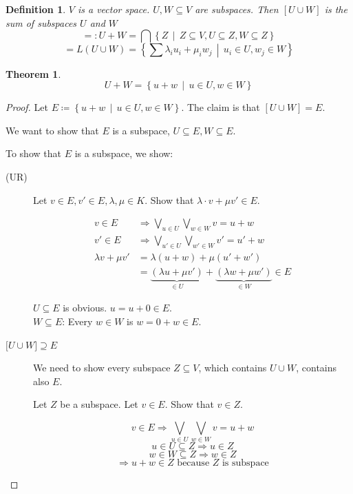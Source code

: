 \documentclass[a4paper,landscape,twocolumn]{article}
\newcommand\setdef[2]{\left\{#1\,\middle|\,#2\right\}}
\newtheorem{theorem}{Theorem}
\newtheorem{defi}{Definition}
\begin{document}
\begin{defi}
  $V$ is a vector space. $U, W \subseteq V$ are subspaces.
  Then $[U \cup W]$ is the \emph{sum of subspaces $U$ and $W$}
  \[
      =: U+W
      = \bigcap \setdef{Z}{Z \subseteq V, U \subseteq Z, W \subseteq Z}
  \] \[
      = L(U \cup W)
      = \setdef{\sum \lambda_i u_i + \mu_i w_j}{u_i \in U, w_j \in W}
  \]
\end{defi}

\begin{theorem}
  \label{satz-4-2}
  \[ U + W = \setdef{u+w}{u \in U, w \in W} \]
\end{theorem}

\begin{proof}
  Let $E \coloneqq \setdef{u+w}{u \in U, w \in W}$.
  The claim is that $\left[U \cup W\right] = E$.

  We want to show that $E$ is a subspace, $U \subseteq E, W \subseteq E$.

  To show that $E$ is a subspace, we show:
  \begin{description}
    \item[(UR)] Let $v \in E, v' \in E, \lambda, \mu \in K$.
      Show that $\lambda \cdot v + \mu v' \in E$.

      \begin{align*}
         v \in E &\Rightarrow \bigvee_{u \in U} \bigvee_{w \in W} v = u + w \\
         v' \in E &\Rightarrow \bigvee_{u' \in U} \bigvee_{w' \in W} v' = u' + w \\
         \lambda v + \mu v' &= \lambda(u + w) + \mu(u' + w') \\
         &= \underbrace{(\lambda u + \mu v')}_{\in U} + \underbrace{(\lambda w + \mu w')}_{\in W} \in E
      \end{align*}

      $U \subseteq E$ is obvious. $u = u + 0 \in E$. \\
      $W \subseteq E$: Every $w \in W$ is $w = 0 + w \in E$.

    \item[${[}U \cup W{]} \supseteq E$]
      We need to show every subspace $Z \subseteq V$, which contains $U \cup W$, contains also $E$.

      Let $Z$ be a subspace. Let $v \in E$. Show that $v \in Z$.

      \[ v \in E \Rightarrow \bigvee_{u \in U} \bigvee_{w \in W} v = u + w \]
      \[ u \in U \subseteq Z \Rightarrow u \in Z \]
      \[ w \in W \subseteq Z \Rightarrow w \in Z \]
      \[ \Rightarrow u + w \in Z \text{ because } Z \text{ is subspace} \]
  \end{description}
\end{proof}
\end{document}
